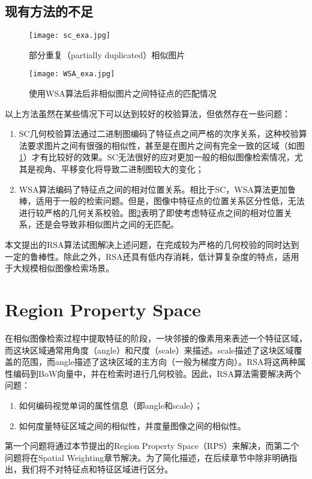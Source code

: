 \subsection{现有方法的不足}
\begin{figure}[h]
	\centering
	\texttt{[image: sc\_exa.jpg]}
	\caption{部分重复（partially duplicated）相似图片}\label{fig:sce}
\end{figure}
\begin{figure}[h]
	\centering
	\texttt{[image: WSA\_exa.jpg]}
	\caption{使用WSA算法后非相似图片之间特征点的匹配情况}\label{fig:wsae}
\end{figure}
以上方法虽然在某些情况下可以达到较好的校验算法，但依然存在一些问题：
\begin{enumerate}
	\item  SC几何校验算法通过二进制图编码了特征点之间严格的次序关系，这种校验算法要求图片之间有很强的相似性，甚至是在图片之间有完全一致的区域（如图\ref{fig:sce}）才有比较好的效果。SC无法很好的应对更加一般的相似图像检索情况，尤其是视角、平移变化将导致二进制图较大的变化；
	\item WSA算法编码了特征点之间的相对位置关系。相比于SC，WSA算法更加鲁棒，适用于一般的检索问题。但是，图像中特征点的位置关系区分性低，无法进行较严格的几何关系校验。图\ref{fig:wsae}表明了即使考虑特征点之间的相对位置关系，还是会导致非相似图片之间的无匹配。
\end{enumerate}

本文提出的RSA算法试图解决上述问题，在完成较为严格的几何校验的同时达到一定的鲁棒性。除此之外，RSA还具有低内存消耗，低计算复杂度的特点，适用于大规模相似图像检索场景。

\section{Region Property Space}
在相似图像检索过程中提取特征的阶段，一块邻接的像素用来表述一个特征区域\cite{tuytelaars2008local}，而这块区域通常用角度（angle）和尺度（scale）来描述。scale描述了这块区域覆盖的范围，而angle描述了这块区域的主方向（一般为梯度方向）。RSA将这两种属性编码到BoW向量中，并在检索时进行几何校验。因此，RSA算法需要解决两个问题：
\begin{enumerate}
	\item 如何编码视觉单词的属性信息（即angle和scale）；
	\item 如何度量特征区域之间的相似性，并度量图像之间的相似性。
\end{enumerate}
第一个问题将通过本节提出的Region Property Space（RPS）来解决，而第二个问题将在Spatial Weighting章节解决。为了简化描述，在后续章节中除非明确指出，我们将不对特征点和特征区域进行区分。

